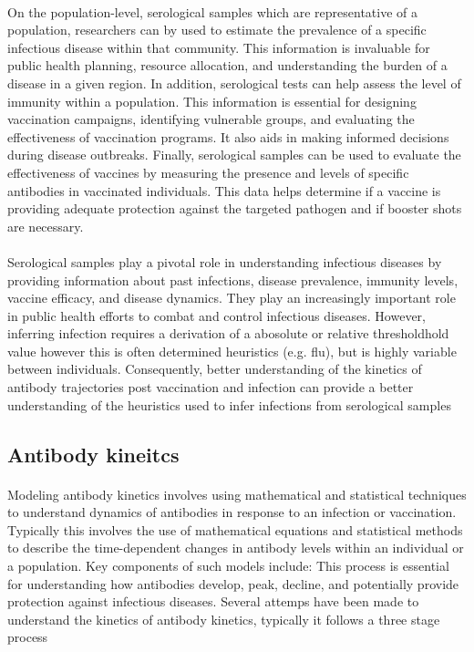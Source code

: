 \documentclass{article}
\begin{document}
\paragraph{}On the population-level, serological samples which are representative of a population, researchers can by used to estimate the prevalence of a specific infectious disease within that community. This information is invaluable for public health planning, resource allocation, and understanding the burden of a disease in a given region. In addition, serological tests can help assess the level of immunity within a population. This information is essential for designing vaccination campaigns, identifying vulnerable groups, and evaluating the effectiveness of vaccination programs. It also aids in making informed decisions during disease outbreaks. Finally, serological samples can be used to evaluate the effectiveness of vaccines by measuring the presence and levels of specific antibodies in vaccinated individuals. This data helps determine if a vaccine is providing adequate protection against the targeted pathogen and if booster shots are necessary.


\paragraph{}Serological samples play a pivotal role in understanding infectious diseases by providing information about past infections, disease prevalence, immunity levels, vaccine efficacy, and disease dynamics. They play an increasingly important role in public health efforts to combat and control infectious diseases. However, inferring infection requires a derivation of a abosolute or relative thresholdhold value however this is often determined heuristics (e.g. flu), but is highly variable between individuals. Consequently, better understanding of the kinetics of antibody trajectories post vaccination and infection can provide a better understanding of the heuristics used to infer infections from serological samples

\subsection{Antibody kineitcs}

\paragraph{}Modeling antibody kinetics involves using mathematical and statistical techniques to understand dynamics of antibodies in response to an infection or vaccination. Typically this involves the use of mathematical equations and statistical methods to describe the time-dependent changes in antibody levels within an individual or a population. Key components of such models include:
This process is essential for understanding how antibodies develop, peak, decline, and potentially provide protection against infectious diseases. Several attemps have been made to understand the kinetics of antibody kinetics, typically it follows a three stage process
\end{document}
